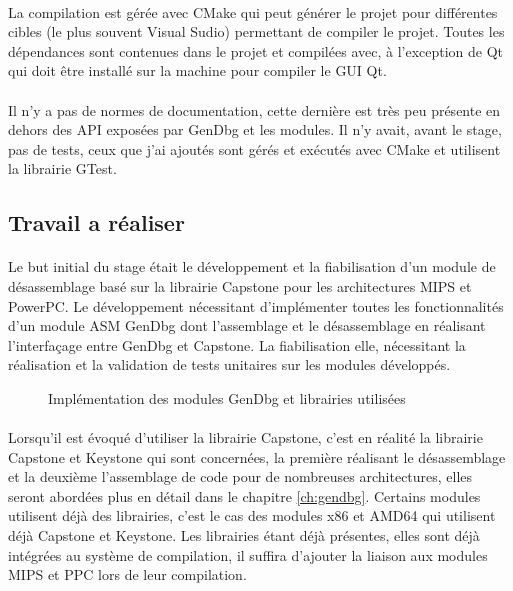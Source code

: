 \documentclass[11pt, book, english, french, standardlists]{upmethodology-document}
\begin{document}
				\paragraph*{}
					La compilation est gérée avec CMake qui peut générer le projet pour différentes cibles (le plus souvent Visual Sudio) permettant de compiler le projet. Toutes les dépendances sont contenues dans le projet et compilées avec, à l'exception de Qt qui doit être installé sur la machine pour compiler le \gls{GUI} Qt.
				\paragraph*{}
					Il n'y a pas de normes de documentation, cette dernière est très peu présente en dehors des \gls{API} exposées par GenDbg et les modules. Il n'y avait, avant le stage, pas de tests, ceux que j'ai ajoutés sont gérés et exécutés avec CMake et utilisent la librairie \gls{GTest}.
			\subsection{Travail a réaliser}
				\paragraph*{}
					Le but initial du stage était le développement et la fiabilisation d'un module de désassemblage basé sur la librairie Capstone pour les architectures \acrshort{MIPS} et PowerPC. Le développement nécessitant d'implémenter toutes les fonctionnalités d'un module ASM GenDbg dont l'assemblage et le désassemblage en réalisant l'interfaçage entre GenDbg et Capstone. La fiabilisation elle, nécessitant la réalisation et la validation de tests unitaires sur les modules développés.
				\begin{figure}[H]
					\centering
					\caption{Implémentation des modules GenDbg et librairies utilisées}
					\label{fig:GenDbg_modules_impl}
				\end{figure}
				\paragraph*{}
					Lorsqu'il est évoqué d'utiliser la librairie Capstone, c'est en réalité la librairie Capstone et Keystone qui sont concernées, la première réalisant le désassemblage et la deuxième l'assemblage de code pour de nombreuses architectures, elles seront abordées plus en détail dans le chapitre \ref{ch:gendbg}. Certains modules utilisent déjà des librairies, c'est le cas des modules x86 et AMD64 qui utilisent déjà Capstone et Keystone. Les librairies étant déjà présentes, elles sont déjà intégrées au système de compilation, il suffira d'ajouter la liaison aux modules \acrshort{MIPS} et \acrshort{PPC} lors de leur compilation.
\end{document}
